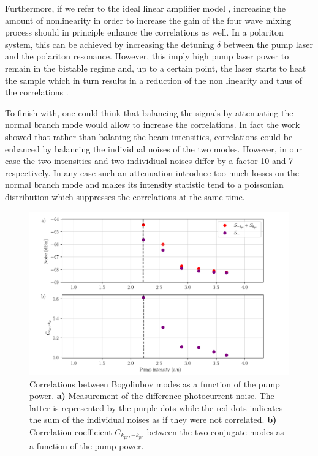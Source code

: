 Furthermore, if we refer 
to the ideal linear amplifier model \cite{boyd_nl_optics}, increasing the amount of nonlinearity in order to increase the gain of the four wave mixing process should in principle enhance the correlations as well. In a polariton
system, this can be achieved by increasing the detuning $\delta$ between the pump laser and the polariton resonance. However, this imply high pump laser power to remain in the bistable regime and, up to a certain point, the laser starts to heat the sample which in turn results in a reduction of the non linearity and thus of the correlations \cite{romanelli_4wm_2007}.


To finish with, one could think that balancing the signals by attenuating the normal branch mode would allow to increase the correlations. In fact the work \cite{Romanelli:04} showed that rather than balaning the beam intensities, correlations could 
be enhanced by balancing the individual noises of the two modes. However, in our case the two intensities and two individiual noises differ by a factor 10 and 7 respectively. In any case such an attenuation
introduce too much losses on the normal branch mode and makes its intensity statistic tend to a poissonian distribution which suppresses the correlations at the same time.





\begin{figure}
    \centering
    \includegraphics[width=1\textwidth]{chap_correlation/fig/correlation_vs_bistab.pdf}
    \caption{Correlations between Bogoliubov modes as a function of the pump power. 
    \textbf{a)} Measurement of the difference photocurrent noise. The latter is represented by the purple dots while the red dots indicates the sum of the individual noises as if they were not correlated. \textbf{b)} Correlation coefficient $C_{k_{pr},-k_{pr}}$ between the two conjugate modes as a function of the pump power.}
    \label{fig:c_vs_bistab}
\end{figure}



